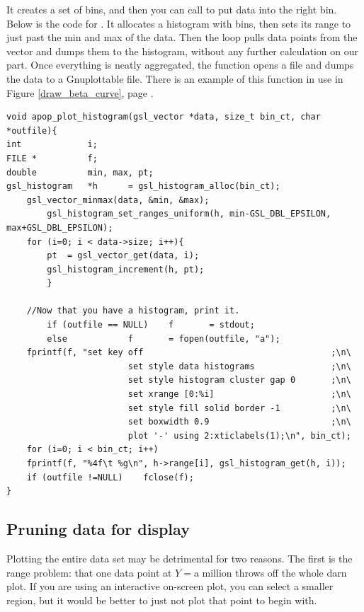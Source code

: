 It creates a set of bins, and
then you can call  to put
data into the right bin. Below is the code for . 
It allocates a histogram with
 bins, then sets its range to just past the min and max
of the data. Then the  loop pulls data points from the vector and
dumps them to the histogram, without any further calculation on our part.
Once everything is neatly aggregated, the function opens a file and dumps the data to a Gnuplottable file. There is an example of this function in use in Figure \ref{draw_beta_curve}, page \pageref{draw_beta_curve}.
\begin{lstlisting}
void apop_plot_histogram(gsl_vector *data, size_t bin_ct, char *outfile){
int             i;
FILE *          f;
double          min, max, pt;
gsl_histogram   *h      = gsl_histogram_alloc(bin_ct);
    gsl_vector_minmax(data, &min, &max);
        gsl_histogram_set_ranges_uniform(h, min-GSL_DBL_EPSILON, max+GSL_DBL_EPSILON);
    for (i=0; i < data->size; i++){
        pt  = gsl_vector_get(data, i);
        gsl_histogram_increment(h, pt);
        }

    //Now that you have a histogram, print it.
        if (outfile == NULL)    f       = stdout;
        else            f       = fopen(outfile, "a");
    fprintf(f, "set key off                                     ;\n\
                        set style data histograms               ;\n\
                        set style histogram cluster gap 0       ;\n\
                        set xrange [0:%i]                       ;\n\
                        set style fill solid border -1          ;\n\
                        set boxwidth 0.9                        ;\n\
                        plot '-' using 2:xticlabels(1);\n", bin_ct);
    for (i=0; i < bin_ct; i++)
    fprintf(f, "%4f\t %g\n", h->range[i], gsl_histogram_get(h, i));
    if (outfile !=NULL)    fclose(f);
}
\end{lstlisting}
\index{histograms!plotting|)}

\subsection {Pruning data for display}
Plotting the entire data set may be detrimental for two reasons. The
first is the range problem: that one data point at $Y=$a million throws off the
whole darn plot. If you are using an interactive on-screen plot, you
can select a smaller region, but it would be better to just not plot
that point to begin with. 

